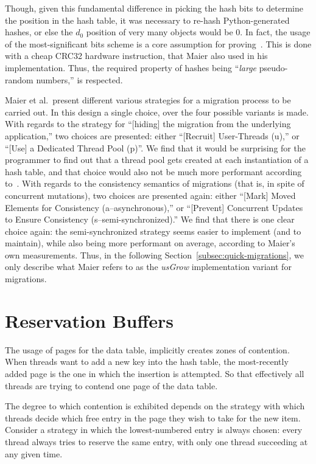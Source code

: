 Though, given this fundamental difference in picking the hash bits to determine the position in the hash table, it was necessary to re-hash Python-generated hashes, or else the $d_0$ position of very many objects would be $0$.
In fact, the usage of the most-significant bits scheme is a core assumption for proving~\cite[Lemma~5.1]{maier}.
This is done with a cheap CRC32 hardware instruction, that Maier also used in his implementation.
Thus, the required property of hashes being ``\emph{large} pseudo-random numbers,'' is respected.

Maier et al.\ present different various strategies for a migration process to be carried out.
In this design a single choice, over the four possible variants is made.
With regards to the strategy for ``[hiding] the migration from the underlying application,'' two choices are presented: either ``[Recruit] User-Threads (u),'' or ``[Use] a Dedicated Thread Pool (p)''.
We find that it would be surprising for the programmer to find out that a thread pool gets created at each instantiation of a hash table, and that choice would also not be much more performant according to~\cite[\S8.4, Using Dedicated Growing Threads]{maier}.
With regards to the consistency semantics of migrations (that is, in spite of concurrent mutations), two choices are presented again: either ``[Mark] Moved Elements for Consistency (a--asynchronous),'' or ``[Prevent] Concurrent Updates to Ensure Consistency (s--semi-synchronized).''
We find that there is one clear choice again: the semi-synchronized strategy seems easier to implement (and to maintain), while also being more performant on average, according to Maier's own measurements.
Thus, in the following Section~\ref{subsec:quick-migrations}, we only describe what Maier refers to as the \emph{usGrow} implementation variant for migrations.


\section{Reservation Buffers}\label{sec:reservation-buffers}

The usage of pages for the data table, implicitly creates zones of contention.
When threads want to add a new key into the hash table, the most-recently added page is the one in which the insertion is attempted.
So that effectively all threads are trying to contend one page of the data table.

The degree to which contention is exhibited depends on the strategy with which threads decide which free entry in the page they wish to take for the new item.
Consider a strategy in which the lowest-numbered entry is always chosen: every thread always tries to reserve the same entry, with only one thread succeeding at any given time.

